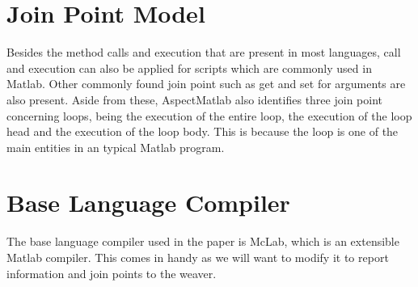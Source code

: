 \documentclass[a4paper]{report}
\begin{document}
\section{Join Point Model}
Besides the method calls and execution that are present in most languages, call and execution can also be applied for scripts which are commonly used in Matlab. Other commonly found join point such as get and set for arguments are also present. Aside from these, AspectMatlab also identifies three join point concerning loops, being the execution of the entire loop, the execution of the loop head and the execution of the loop body. This is because the loop is one of the main entities in an typical Matlab program.

\section{Base Language Compiler}
The base language compiler used in the paper is McLab, which is an extensible Matlab compiler. This comes in handy as we will want to modify it to report information and join points to the weaver.
\end{document}
